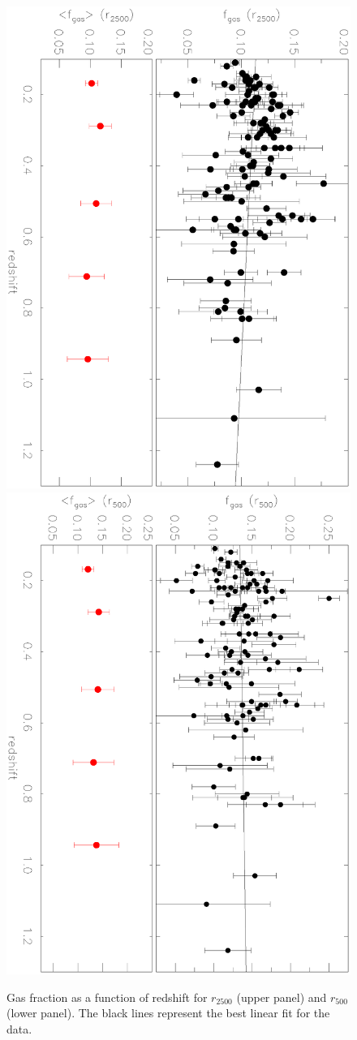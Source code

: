 \documentclass{aa}
\begin{document}
\begin{figure}[ht!]
\centering
\includegraphics[angle=90,width=9.cm]{fgas_redshift_r2500.ps}
\includegraphics[angle=90,width=9.cm]{fgas_redshift_r500.ps}
\caption{Gas fraction as a function of redshift for $r_{2500}$ (upper panel) and $r_{500}$ (lower panel). 
The black lines represent the best linear fit for the data.}
\label{fig:fgasz}
\end{figure}
\end{document}

